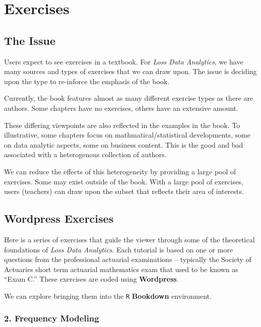 \documentclass[]{article}
\begin{document}
\section{Exercises}\label{S:Exercises}

\subsection{The Issue}\label{the-issue}

Users expect to see exercises in a textbook. For \emph{Loss Data
Analytics}, we have many sources and types of exercises that we can draw
upon. The issue is deciding upon the type to re-inforce the emphasis of
the book.

Currently, the book features almost as many different exercise types as
there are authors. Some chapters have no exercises, others have an
extensive amount.

These differing viewpoints are also reflected in the examples in the
book. To illustrative, some chapters focus on mathmatical/statistical
developments, some on data analytic aspects, some on business content.
This is the good and bad associated with a heterogenous collection of
authors.

We can reduce the effects of this heterogeneity by providing a large
pool of exercises. Some may exist outside of the book. With a large pool
of exercises, users (teachers) can draw upon the subset that reflects
their area of interests.

\subsection{Wordpress Exercises}\label{wordpress-exercises}

Here is a series of exercises that guide the viewer through some of the
theoretical foundations of \emph{Loss Data Analytics}. Each tutorial is
based on one or more questions from the professional actuarial
examinations -- typically the Society of Actuaries short term actuarial
mathematics exam that used to be known as ``Exam C.'' These exercises
are coded using \textbf{Wordpress}.

We can explore bringing them into the \texttt{R} \textbf{Bookdown}
environment.

\subsubsection{2. Frequency Modeling}\label{frequency-modeling-1}
\end{document}
